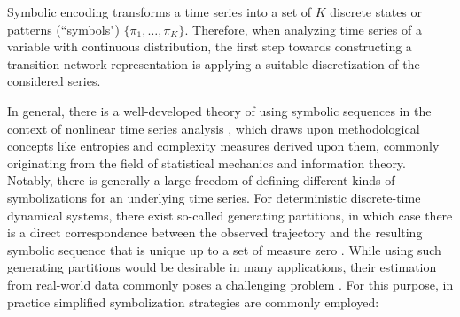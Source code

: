 Symbolic encoding transforms a time series into a set of $K$ discrete states or patterns (``symbols") $\{\pi_1, \dots , \pi_K \}$. Therefore, when analyzing time series of a variable with continuous distribution, the first step towards constructing a transition network representation is applying a suitable discretization of the considered series. 

In general, there is a well-developed theory of using symbolic sequences in the context of nonlinear time series analysis \cite{Daw2003,Finn2003,Amigo2010}, which draws upon methodological concepts like entropies and complexity measures derived upon them, commonly originating from the field of statistical mechanics and information theory. Notably, there is generally a large freedom of defining different kinds of symbolizations for an underlying time series. For deterministic discrete-time dynamical systems, there exist so-called generating partitions, in which case there is a direct correspondence between the observed trajectory and the resulting symbolic sequence that is unique up to a set of measure zero \cite{Grassberger1985,Christiansen1996,Christiansen1997}. While using such generating partitions would be desirable in many applications, their estimation from real-world data commonly poses a challenging problem \cite{Kennel2003,Hirata2004,Buhl2005}. For this purpose, in practice simplified symbolization strategies are commonly employed:

